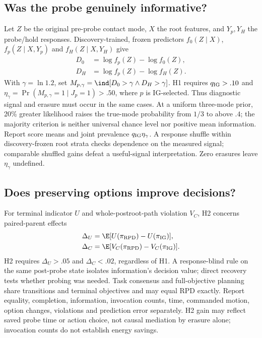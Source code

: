 \subsection{Was the probe genuinely informative?}
Let $Z$ be the original pre-probe contact mode, $X$ the root features, and $Y_p,Y_H$ the probe/hold responses. Discovery-trained, frozen predictors $f_0(Z\mid X)$, $f_p(Z\mid X,Y_p)$ and $f_H(Z\mid X,Y_H)$ give
\begin{equation}
 \begin{split}D_0&=\log f_p(Z)-\log f_0(Z),\\D_H&=\log f_p(Z)-\log f_H(Z).\end{split}
\end{equation}
With $\gamma=\ln1.2$, set $M_{p,\gamma}=\ind[D_0>\gamma\land D_H>\gamma]$. H1 requires $q_{\rm IG}>.10$ and $\eta_\gamma=\Pr(M_{p,\gamma}=1\mid J_p=1)>.50$, where $p$ is IG-selected. Thus diagnostic signal and erasure must occur in the same cases. At a uniform three-mode prior, 20\% greater likelihood raises the true-mode probability from $1/3$ to above $.4$; the majority criterion is neither universal chance level nor positive mean information. Report score means and joint prevalence $q_{\rm IG}\eta_\gamma$. A response shuffle within discovery-frozen root strata checks dependence on the measured signal; comparable shuffled gains defeat a useful-signal interpretation. Zero erasures leave $\eta_\gamma$ undefined.

\subsection{Does preserving options improve decisions?}
For terminal indicator $U$ and whole-postroot-path violation $V_C$, H2 concerns paired-parent effects
\begin{equation}
 \begin{split}\Delta_U&=\E[U(\pi_{\rm RPD})-U(\pi_{\rm IG})],\\
 \Delta_C&=\E[V_C(\pi_{\rm RPD})-V_C(\pi_{\rm IG})].\end{split}
\end{equation}
H2 requires $\Delta_U>.05$ and $\Delta_C<.02$, regardless of H1. A response-blind rule on the same post-probe state isolates information's decision value; direct recovery tests whether probing was needed. Task consensus and full-objective planning share transitions and terminal objectives and may equal RPD exactly. Report equality, completion, information, invocation counts, time, commanded motion, option changes, violations and prediction error separately. H2 gain may reflect saved probe time or action choice, not causal mediation by erasure alone; invocation counts do not establish energy savings.

